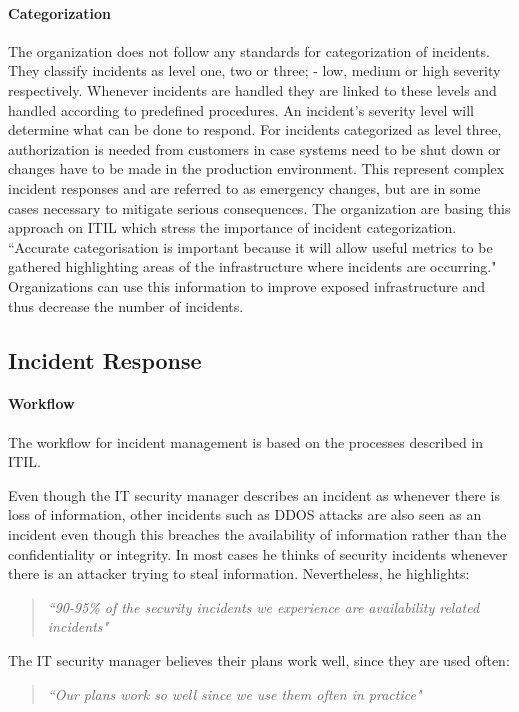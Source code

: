 \paragraph{Categorization}
The organization does not follow any standards for categorization of incidents. They classify incidents as level one, two or three; - low, medium or high severity respectively. Whenever incidents are handled they are linked to these levels and handled according to predefined procedures. An incident's severity level will determine what can be done to respond. For incidents categorized as level three, authorization is needed from customers in case systems need to be shut down or changes have to be made in the production environment. This represent complex incident responses and are referred to as emergency changes, but are in some cases necessary to mitigate serious consequences. The organization are basing this approach on ITIL which stress the importance of incident categorization. ``Accurate categorisation is important because it will allow useful metrics to be gathered highlighting areas of the infrastructure where incidents are occurring\cite{itilbok}." Organizations can use this information to improve exposed infrastructure and thus decrease the number of incidents.

\subsection{Incident Response}
\paragraph{Workflow}
The workflow for incident management is based on the processes described in ITIL.

Even though the IT security manager describes an incident as whenever there is loss of information, other incidents such as DDOS attacks are also seen as an incident even though this breaches the availability of information rather than the confidentiality or integrity. In most cases he thinks of security incidents whenever there is an attacker trying to steal information. Nevertheless, he highlights:
\begin{quote}
\textit{``90-95\% of the security incidents we experience are availability related incidents"}
\end{quote}

The IT security manager believes their plans work well, since they are used often:
\begin{quote}
\textit{``Our plans work so well since we use them often in practice"}
\end{quote}


